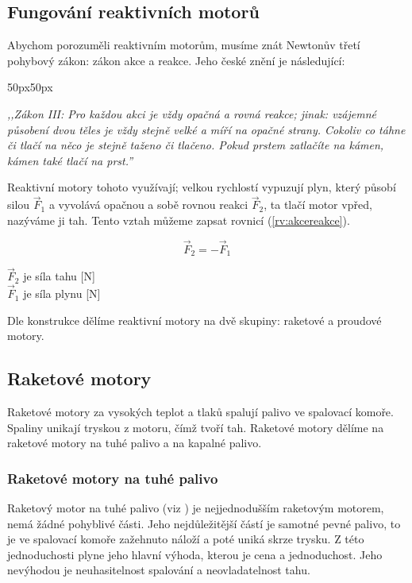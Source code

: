 \subsection{Fungování reaktivních motorů}\label{sc:AkceReakce}
{Abychom porozuměli reaktivním motorům, musíme znát Newtonův třetí pohybový zákon: zákon akce a reakce. Jeho české znění je následující:}
\cite{MIT:NewtonsLawsOfMotion}
\begin{changemargin}{50px}{50px}
    \begin{center}
        \textit{,,Zákon III: Pro každou akci je vždy opačná a rovná reakce; jinak: vzájemné působení dvou těles je vždy stejně velké a míří na opačné strany. Cokoliv co táhne či tlačí na něco je stejně taženo či tlačeno. Pokud prstem zatlačíte na kámen, kámen také tlačí na prst.''}
        \cite{MIT:NewtonsLawsOfMotion}
    \end{center}
\end{changemargin}
{Reaktivní motory tohoto využívají; velkou rychlostí vypuzují plyn, který působí silou \(\vec{F}_{1}\) a vyvolává opačnou a sobě rovnou reakci \(\vec{F}_{2}\), ta tlačí motor vpřed, nazýváme ji tah. Tento vztah můžeme zapsat rovnicí (\ref{rv:akcereakce}).}
\cite{MIT:NewtonsLawsOfMotion}

\begin{equation} \label{rv:akcereakce}
    \vec{F}_{2}=-\vec{F}_{1}
\end{equation}

{\(\vec{F}_{2}\) je síla tahu [N]}\\
{\(\vec{F}_{1}\) je síla plynu [N]}\\
\podst

{Dle konstrukce dělíme reaktivní motory na dvě skupiny: raketové a proudové motory.}
\cite{VUTB:PrehledTechnickychAspektuVyvojeLeteckychProudovychMotoru}

\newpage

\subsection{Raketové motory}
{Raketové motory za vysokých teplot a tlaků spalují palivo ve spalovací komoře. Spaliny unikají tryskou z motoru, čímž tvoří tah.}
\cite{VUTB:NavrhRaketovehoMotoru}\odst
{Raketové motory dělíme na raketové motory na tuhé palivo a na kapalné palivo.}
\cite{VUTB:NavrhRaketovehoMotoru}

\subsubsection{Raketové motory na tuhé palivo}
{Raketový motor na tuhé palivo (viz ) je nejjednodušším raketovým motorem, nemá žádné pohyblivé části. Jeho nejdůležitější částí je samotné pevné palivo, to je ve spalovací komoře zažehnuto náloží a poté uniká skrze trysku. Z této jednoduchosti plyne jeho hlavní výhoda, kterou je cena a jednoduchost. Jeho nevýhodou je neuhasitelnost spalování a neovladatelnost tahu.}
\cite{VUTB:NavrhRaketovehoMotoru}


